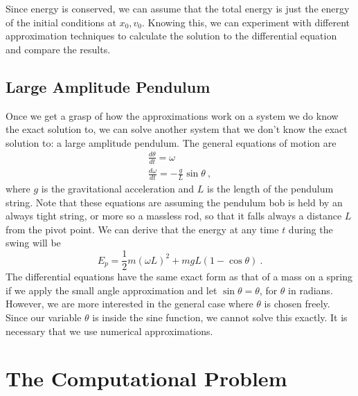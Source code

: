 \documentclass[aps,prl,twocolumn,superscriptaddress]{revtex4-1}
\begin{document}
Since energy is conserved, we can assume that the total energy is just the energy of the initial conditions at $x_0, v_0$. Knowing this, we can experiment with different approximation techniques to calculate the solution to the differential equation and compare the results.

\subsection{Large Amplitude Pendulum}
Once we get a grasp of how the approximations work on a system we do know the exact solution to, we can solve another system that we don't know the exact solution to: a large amplitude pendulum. The general equations of motion are
\begin{align}
\frac{d\theta}{dt} = \omega \label{eqn:pend1} \\
\frac{d\omega}{dt} = -\frac{g}{L} \sin \theta \label{eqn:pend2} ~,
\end{align}
where $g$ is the gravitational acceleration and $L$ is the length of the pendulum string. Note that these equations are assuming the pendulum bob is held by an always tight string, or more so a massless rod, so that it falls always a distance $L$ from the pivot point. We can derive that the energy at any time $t$ during the swing will be
\begin{equation}
E_p = \frac{1}{2}m(\omega L)^2 + mgL(1-\cos\theta) \label{eqn:pendener} ~.
\end{equation}
The differential equations have the same exact form as that of a mass on a spring if we apply the small angle approximation and let $\sin \theta = \theta$, for $\theta$ in radians. However, we are more interested in the general case where $\theta$ is chosen freely. Since our variable $\theta$ is inside the sine function, we cannot solve this exactly. It is necessary that we use numerical approximations.

\section{The Computational Problem}
\end{document}

